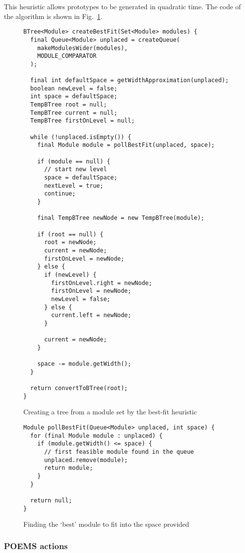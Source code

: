 This heuristic allows prototypes to be generated in quadratic time. The code of the algorithm is shown in Fig.~\ref{alg:bestfit}.

\begin{figure}
\centering
\begin{lstlisting}
BTree<Module> createBestFit(Set<Module> modules) {
  final Queue<Module> unplaced = createQueue(
    makeModulesWider(modules), 
    MODULE_COMPARATOR
  );
    
  final int defaultSpace = getWidthApproximation(unplaced);
  boolean newLevel = false;
  int space = defaultSpace;
  TempBTree root = null;
  TempBTree current = null;
  TempBTree firstOnLevel = null;
  
  while (!unplaced.isEmpty()) {
    final Module module = pollBestFit(unplaced, space);
    
    if (module == null) {
      // start new level
      space = defaultSpace;
      nextLevel = true;
      continue;
    }
    
    final TempBTree newNode = new TempBTree(module);
    
    if (root == null) {
      root = newNode;
      current = newNode;
      firstOnLevel = newNode;
    } else {
      if (newLevel) {
        firstOnLevel.right = newNode;
        firstOnLevel = newNode;        
        newLevel = false;
      } else {
        current.left = newNode;
      }
      
      current = newNode;
    }
    
    space -= module.getWidth();
  }
  
  return convertToBTree(root);
}
\end{lstlisting}
\caption{Creating a tree from a module set by the best-fit heuristic}
\label{alg:bestfit}
\end{figure}

\begin{figure}
\centering
\begin{lstlisting}
Module pollBestFit(Queue<Module> unplaced, int space) {
  for (final Module module : unplaced) {
    if (module.getWidth() <= space) {
      // first feasible module found in the queue
      unplaced.remove(module);
      return module;
    }
  }
  
  return null;
}
\end{lstlisting}
\caption{Finding the `best' module to fit into the space provided}
\label{alg:bestfittree}
\end{figure}

\subsubsection{POEMS actions}

